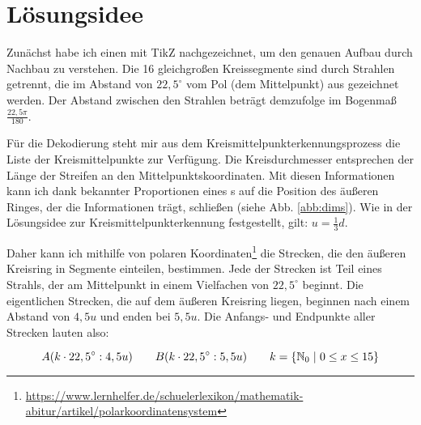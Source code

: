 \section{Lösungsidee}
	\begin{wrapfigure}{r}{0.35\textwidth}
		\setlength\intextsep{0pt}
		\centering
		
		\caption{}
		\label{abb:spidergrafik}
		\vspace{-20pt}
	\end{wrapfigure}
Zunächst habe ich einen \task{} mit TikZ nachgezeichnet, um den genauen Aufbau durch Nachbau zu verstehen. Die 16 gleichgroßen Kreissegmente sind durch Strahlen getrennt, die im Abstand von \(22,5^{\circ}\) vom Pol (dem Mittelpunkt) aus gezeichnet werden. Der Abstand zwischen den Strahlen beträgt demzufolge im Bogenmaß \(\frac{22,5\pi}{180}\).

Für die Dekodierung steht mir aus dem Kreismittelpunkterkennungsprozess die Liste der Kreismittelpunkte zur Verfügung. Die Kreisdurchmesser entsprechen der Länge der Streifen an den Mittelpunktskoordinaten. Mit diesen Informationen kann ich dank bekannter Proportionen eines \task{}s auf die Position des äußeren Ringes, der die Informationen trägt, schließen (siehe Abb. \ref{abb:dims}). Wie in der Lösungsidee zur Kreismittelpunkterkennung festgestellt, gilt: \(u=\frac{1}{3}d\).

\begin{wrapfigure}{r}{0.25\textwidth}
	\setlength\intextsep{0pt}
	\centering	
	
	\caption{}
	\label{abb:trigon}
\end{wrapfigure}
Daher kann ich mithilfe von polaren Koordinaten\footnote{\url{https://www.lernhelfer.de/schuelerlexikon/mathematik-abitur/artikel/polarkoordinatensystem}} die Strecken, die den äußeren Kreisring in Segmente einteilen, bestimmen. Jede der Strecken ist Teil eines Strahls, der am Mittelpunkt in einem Vielfachen von \(22,5^{\circ}\) beginnt. Die eigentlichen Strecken, die auf dem äußeren Kreisring liegen, beginnen nach einem Abstand von \(4,5u\) und enden bei \(5,5u\). Die Anfangs- und Endpunkte aller Strecken lauten also:

\begin{equation}
\label{eq:streckek}
A(k \cdot 22,5^{\circ}:4,5u) \hspace{2em} B(k \cdot 22,5^{\circ}:5,5u) \hspace{2em} k = \{\mathbb{N}_0 \hspace{0.3em}|\hspace{0.3em} 0 \le x \le 15\}
\end{equation}

